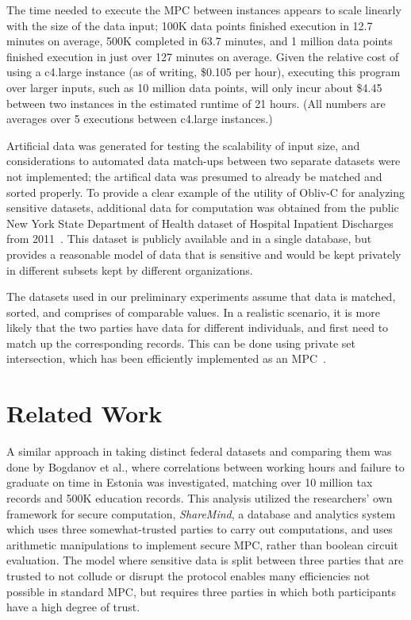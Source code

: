 \documentclass[conference]{IEEEtran}
\begin{document}
The time needed to execute the MPC between instances appears to scale
linearly with the size of the data input; 100K data points finished
execution in 12.7 minutes on average, 500K completed in 63.7 minutes,
and 1 million data points finished execution in just over 127 minutes on
average. Given the relative cost of using a c4.large instance (as of
writing, \$0.105 per hour), executing this program over larger inputs,
such as 10 million data points, will only incur about \$4.45 between two
instances in the estimated runtime of 21 hours.  (All numbers are
averages over 5 executions between c4.large instances.)

Artificial data was generated for testing the scalability of input size,
and considerations to automated data match-ups between two separate
datasets were not implemented; the artifical data was presumed to
already be matched and sorted properly.  To provide a clear example of
the utility of Obliv-C for analyzing sensitive datasets, additional data
for computation was obtained from the public New York State Department
of Health dataset of Hospital Inpatient Discharges from
2011~\cite{healthdata:ny}.  This dataset is publicly available and in a
single database, but provides a reasonable model of data that is
sensitive and would be kept privately in different subsets kept by
different organizations.


The datasets used in our preliminary experiments assume that data is
matched, sorted, and comprises of comparable values. In a realistic
scenario, it is more likely that the two parties have data for different
individuals, and first need to match up the corresponding records.  This
can be done using private set intersection, which has been efficiently
implemented as an MPC~\cite{NDSS:HuaEvaKat12}.

\section{Related Work}

A similar approach in taking distinct federal datasets and comparing
them was done by Bogdanov et al., where correlations between working
hours and failure to graduate on time in Estonia was investigated,
matching over 10 million tax records and 500K education
records\cite{cryptoeprint:2015:1159}.  This analysis utilized the
researchers' own framework for secure computation, \emph{ShareMind}, a
database and analytics system which uses three somewhat-trusted parties
to carry out computations, and uses arithmetic manipulations to
implement secure MPC, rather than boolean circuit
evaluation\cite{sharemind}.  The model where sensitive data is split
between three parties that are trusted to not collude or disrupt the
protocol enables many efficiencies not possible in standard MPC, but
requires three parties in which both participants have a high degree of
trust.
\end{document}
